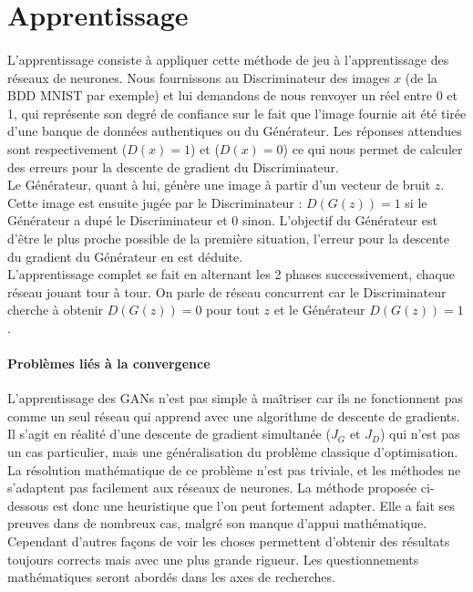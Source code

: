 \section{Apprentissage}

	\paragraph{}
		L’apprentissage consiste à appliquer cette méthode de jeu à l'apprentissage des réseaux de neurones.
		Nous fournissons au Discriminateur des images $x$ (de la BDD MNIST par exemple) et lui demandons de nous renvoyer un réel entre 0 et 1, qui représente son degré de confiance sur le fait que l’image fournie ait été tirée d’une banque de données authentiques ou du Générateur. Les réponses attendues sont respectivement ($D(x) = 1$) et ($D(x) =0$) ce qui nous permet de calculer des erreurs pour la descente de gradient du Discriminateur.\\ 
		Le Générateur, quant à lui, génère une image à partir d’un vecteur de bruit $z$. Cette image est ensuite jugée par le Discriminateur : $D(G(z)) = 1$ si le Générateur a dupé le Discriminateur et 0 sinon. L'objectif du Générateur est d'être le plus proche possible de la première situation, l'erreur pour la descente du gradient du Générateur en est déduite.\\
		L'apprentissage complet se fait en alternant les 2 phases successivement, chaque réseau jouant tour à tour. On parle de réseau concurrent car le Discriminateur cherche à obtenir $D(G(z)) = 0 $ pour tout $z$ et le Générateur $D(G(z)) = 1$.

	\paragraph*{Problèmes liés à la convergence}
		L'apprentissage des GANs n'est pas simple à maîtriser car ils ne fonctionnent pas comme un seul réseau qui apprend avec une algorithme de descente de gradients. Il s'agit en réalité d'une descente de gradient simultanée ($J_G \text{ et } J_D$) qui n'est pas un cas particulier, mais une généralisation du problème classique d'optimisation. La résolution mathématique de ce problème n'est pas triviale, et les méthodes ne s'adaptent pas facilement aux réseaux de neurones. La méthode proposée ci-dessous est donc une heuristique que l'on peut fortement adapter. Elle a fait ses preuves dans de nombreux cas, malgré son manque d’appui mathématique. Cependant d'autres façons de voir les choses permettent d'obtenir des résultats toujours corrects mais avec une plus grande rigueur. Les questionnements mathématiques seront abordés dans les axes de recherches.  

